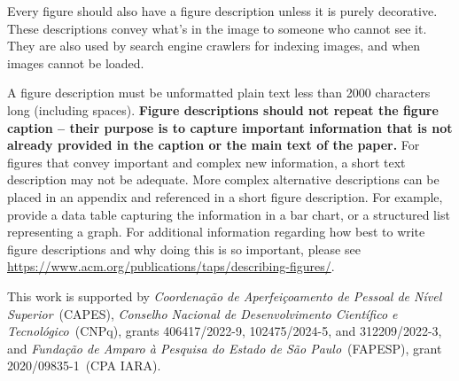 \documentclass[sigconf,natbib=false]{acmart}
\begin{document}
Every figure should also have a figure description unless it is purely
decorative. These descriptions convey what’s in the image to someone
who cannot see it. They are also used by search engine crawlers for
indexing images, and when images cannot be loaded.

A figure description must be unformatted plain text less than 2000
characters long (including spaces).  {\bfseries Figure descriptions
  should not repeat the figure caption – their purpose is to capture
  important information that is not already provided in the caption or
  the main text of the paper.} For figures that convey important and
complex new information, a short text description may not be
adequate. More complex alternative descriptions can be placed in an
appendix and referenced in a short figure description. For example,
provide a data table capturing the information in a bar chart, or a
structured list representing a graph.  For additional information
regarding how best to write figure descriptions and why doing this is
so important, please see
\url{https://www.acm.org/publications/taps/describing-figures/}.


\begin{acks}
This work is supported by \textit{Coordenação de Aperfeiçoamento de Pessoal de Nível Superior}~(CAPES), \textit{Conselho Nacional de Desenvolvimento Científico e Tecnológico}~(CNPq), grants 406417/2022-9, 102475/2024-5, and 312209/2022-3, and \textit{Fundação de Amparo à Pesquisa do Estado de São Paulo}~(FAPESP), grant 2020/09835-1~(CPA IARA). 
\end{acks}


\printbibliography
\end{document}
